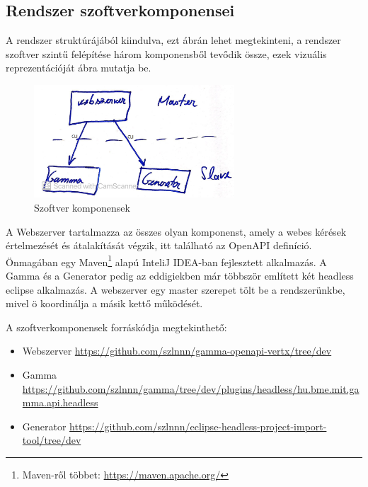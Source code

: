 \subsection{Rendszer szoftverkomponensei}

A rendszer struktúrájából kiindulva, ezt  ábrán lehet megtekinteni, a rendszer szoftver szintű felépítése három komponensből tevődik össze, ezek vizuális reprezentációját  ábra mutatja be.

\begin{figure}[t]
	\includegraphics[width=75mm, keepaspectratio]{figures/software_components.jpg}
	\caption{Szoftver komponensek}
	\label{fig:software_components}
\end{figure}

A Webszerver tartalmazza az összes olyan komponenst, amely a webes kérések értelmezését és átalakítását végzik, itt található az OpenAPI definíció. Önmagában egy Maven\footnote{Maven-ről többet: \url{https://maven.apache.org/}} alapú InteliJ IDEA-ban fejlesztett alkalmazás. A Gamma és a Generator pedig az eddigiekben már többször említett két headless eclipse alkalmazás. A webszerver egy master szerepet tölt be a rendszerünkbe, mivel ö koordinálja a másik kettő működését.

A szoftverkomponensek forráskódja megtekinthető:

\begin{itemize}
	\item Webszerver \url{https://github.com/szlnnn/gamma-openapi-vertx/tree/dev}
	\item Gamma \url{https://github.com/szlnnn/gamma/tree/dev/plugins/headless/hu.bme.mit.gamma.api.headless}
	\item Generator \url{https://github.com/szlnnn/eclipse-headless-project-import-tool/tree/dev}
\end{itemize}